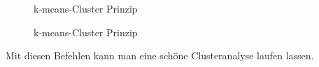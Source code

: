 \documentclass[
  10pt,
  letterpaper,
  a4paper, twoside]{scrreprt}
\begin{document}
\begin{figure}


\caption{\label{fig-kmeans-Animation-5}k-means-Cluster Prinzip}

\end{figure}%

\begin{figure}


\caption{\label{fig-kmeans-Animation-6}k-means-Cluster Prinzip}

\end{figure}%

Mit diesen Befehlen kann man eine schöne Clusteranalyse laufen lassen.
\end{document}
